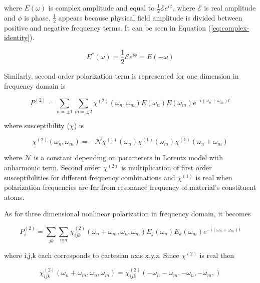 \documentclass[thesis]{deutez}
\begin{document}
    where $E(\omega)$ is complex amplitude and equal to $\frac{1}{2}\mathcal{E}e^{i \phi}$, where $\mathcal{E}$ is real amplitude and $\phi$ is phase. $\frac{1}{2}$ appears because physical field amplitude is divided between positive and negative frequency terms. It can be seen in Equation (\ref{eq:complex-identity}).
     
    \begin{equation}
        E^*(\omega) = \frac{1}{2}\mathcal{E}e^{i\phi}=E(-\omega)
        \label{eq:complex-identity}
    \end{equation}
    
    Similarly, second order polarization term is represented for one dimension in frequency domain is 

    \begin{equation}
        P^{(2)} = \sum_{n=\pm1} \sum_{m=\pm2} \chi^{(2)}(\omega_n,\omega_m)E(\omega_n)E(\omega_m)e^{-i(\omega_n+\omega_m) t}
        \label{eq:nonpol_freq}
    \end{equation}
    
    where susceptibility ($\chi$) is
    
    \begin{equation}
        \chi^{(2)} (\omega_n,\omega_m) = - \mathcal{N} \chi^{(1)} (\omega_n) \chi^{(1)} (\omega_m) \chi^{(1)} (\omega_n+\omega_m)
        \label{eq:chi_decomposition}
    \end{equation}
       
    where $\mathcal{N}$ is a constant depending on parameters in Lorentz model with anharmonic term. Second order $\chi^{(2)}$ is multiplication of first order susceptibilities for different frequency combinations and $\chi^{(1)}$ is real when polarization frequencies are far from resonance frequency of material's constituent atoms.  

    As for three dimensional nonlinear polarization in frequency domain, it becomes

    \begin{equation}
        P_i^{(2)} = \sum_{jk}\sum_{nm} \chi^{(2)}_{ijk}(\omega_n+\omega_m, \omega_n, \omega_m) E_j(\omega_n)E_k(\omega_m)e^{-i(\omega_n+\omega_m)t}
        \label{eq:sca_pol_conv_freq}
    \end{equation}

    where i,j,k each corresponds to cartesian axis x,y,z. Since $\chi^{(2)}$ is real then
    
    \begin{equation}
        \chi^{(2)}_{ijk}(\omega_n+\omega_m,\omega_n,\omega_m) = \chi^{(2)}_{ijk}(-\omega_n-\omega_m,-\omega_n,-\omega_m,)
        \label{eq:chi-real-condi}
    \end{equation}
    
\end{document}
